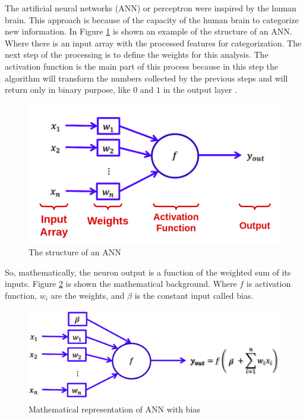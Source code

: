 The artificial neural networks (ANN) or perceptron were inspired by the human brain. This approach is because of the capacity of the human brain to categorize new information. In Figure \ref{fig:ann} is shown an example of the structure of an ANN. Where there is an input array with the processed features for categorization. The next step of the processing is to define the weights for this analysis. The activation function is the main part of this process because in this step the algorithm will transform the numbers collected by the previous steps and will return only in binary purpose, like $0$ and $1$ in the output layer \cite{goodfellow2016deep}.

\begin{figure}[H]
\centering
\includegraphics[width=\columnwidth]{imagens/ann.png}
\caption{The structure of an ANN}
\label{fig:ann}
\end{figure}

So, mathematically, the neuron output is a function of the weighted sum of its inputs. Figure \ref{fig:ann_weight} is shown the mathematical background. Where $f$ is activation function, $w_i$ are the weights, and $\beta$ is the constant input called bias.


\begin{figure}[H]
\centering
\includegraphics[width=\columnwidth]{imagens/math_ann_bias.png}
\caption{Mathematical representation of ANN with bias}
\label{fig:ann_weight}
\end{figure}


